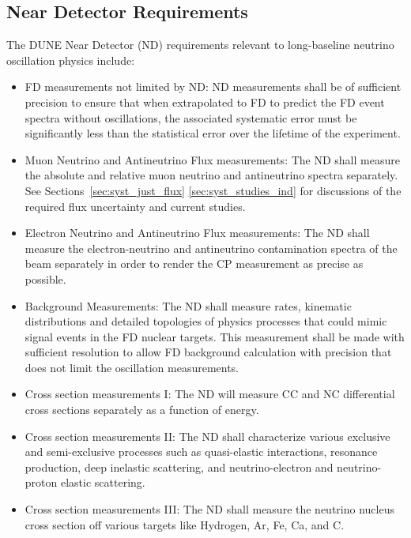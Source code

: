 \subsection{Near Detector Requirements}
\label{sec:physics-lbnosc-nd-req}

The DUNE Near Detector (ND) requirements relevant to long-baseline
neutrino oscillation physics include:
\begin{itemize}
\item FD measurements not limited by ND: ND measurements shall be of
  sufficient precision to ensure that when extrapolated to FD to
  predict the FD event spectra without oscillations, the associated
  systematic error must be significantly less than the statistical
  error over the lifetime of the experiment.
\item Muon Neutrino and Antineutrino Flux measurements: The ND shall
  measure the absolute and relative muon neutrino and antineutrino
  spectra separately.  See Sections~\ref{sec:syst_just_flux}
  \ref{sec:syst_studies_ind} for discussions of the required flux
  uncertainty and current studies.
\item Electron Neutrino and Antineutrino Flux measurements: The ND
  shall measure the electron-neutrino and antineutrino contamination
  spectra of the beam separately in order to render the CP measurement
  as precise as possible.
 \item Background Measurements: The ND shall measure rates, kinematic
   distributions and detailed topologies of physics processes that
   could mimic signal events in the FD nuclear targets. This
   measurement shall be made with sufficient resolution to allow FD
   background calculation with precision that does not limit the
   oscillation measurements.
 \item Cross section measurements I: The ND will measure CC and NC
   differential cross sections separately as a function of energy.
 \item Cross section measurements II: The ND shall characterize
   various exclusive and semi-exclusive processes such as
   quasi-elastic interactions, resonance production, deep inelastic
   scattering, and neutrino-electron and neutrino-proton elastic
   scattering.
 \item Cross section measurements III: The ND shall measure the
   neutrino nucleus cross section off various targets like Hydrogen,
   Ar, Fe, Ca, and C.
\end{itemize}



